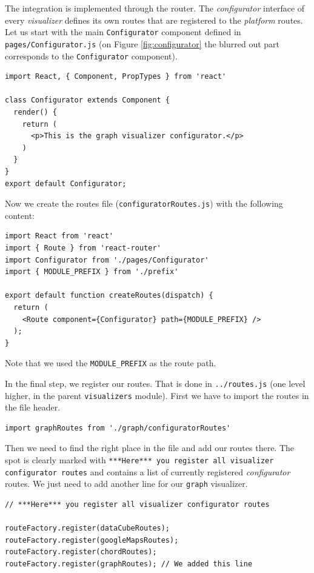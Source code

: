 The integration is implemented through the router. The \emph{configurator} interface of every \emph{visualizer} defines its own routes that are registered to the \emph{platform} routes. Let us start with the main \texttt{Configurator} component defined in \texttt{pages/Configurator.js} (on Figure \ref{fig:configurator} the blurred out part corresponds to the \texttt{Configurator} component).

\begin{verbatim}
import React, { Component, PropTypes } from 'react'

class Configurator extends Component {
  render() {
    return (
      <p>This is the graph visualizer configurator.</p>
    )
  }
}
export default Configurator;
\end{verbatim}

Now we create the routes file (\texttt{configuratorRoutes.js}) with the following content:

\begin{verbatim}
import React from 'react'
import { Route } from 'react-router'
import Configurator from './pages/Configurator'
import { MODULE_PREFIX } from './prefix'

export default function createRoutes(dispatch) {
  return (
    <Route component={Configurator} path={MODULE_PREFIX} />
  );
}
\end{verbatim}

Note that we used the \texttt{MODULE\_PREFIX} as the route path.

In the final step, we register our routes. That is done in \texttt{../routes.js} (one level higher, in the parent \texttt{visualizers} module). First we have to import the routes in the file header.

\begin{verbatim}
import graphRoutes from './graph/configuratorRoutes'
\end{verbatim}

Then we need to find the right place in the file and add our routes there. The spot is clearly marked with \texttt{***Here*** you register all visualizer configurator routes} and contains a list of currently registered \emph{configurator} routes. We just need to add another line for our \texttt{graph} visualizer.

\begin{verbatim}
// ***Here*** you register all visualizer configurator routes

routeFactory.register(dataCubeRoutes);
routeFactory.register(googleMapsRoutes);
routeFactory.register(chordRoutes);
routeFactory.register(graphRoutes); // We added this line
\end{verbatim}

